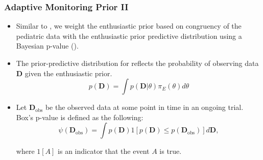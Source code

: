 \documentclass{beamer}
\begin{document}
\begin{frame} \frametitle{Adaptive Monitoring Prior II}
	\begin{itemize}
		\item Similar to \cite{Psioda2020JBS}, we weight the enthusiastic prior based on  
					congruency of the pediatric data with the enthusiastic prior predictive distribution
					using a Bayesian p-value (\cite{Box1980}).
		
		\vspace{0.2cm}								
		\item The prior-predictive distribution for reflects the probability of 
					observing data $\mathbf{D}$ given the enthusiastic prior.
						\begin{equation*}
								p(\mathbf{D}) =\int p(\mathbf{D}|\theta)\pi_E(\theta)d\theta
						\end{equation*}

		\vspace{0.0cm}								
		\item Let $\mathbf{D}_{\text{obs}}$ be the observed data at some point in time in an ongoing trial. 
		         Box's p-value is defined as the following:
						\begin{equation*}
								\psi({\mathbf{D}_{\text{obs}}})=\int {p(\mathbf{D})}  1[p(\mathbf{D})\leq p(\mathbf{D}_{\text{obs}})] d\mathbf{D},
						\end{equation*}
						
						\vspace{-0.25cm}
						where $1[A]$ is an indicator that the event $A$ is true.
\end{itemize}
\end{frame}
\end{document}
